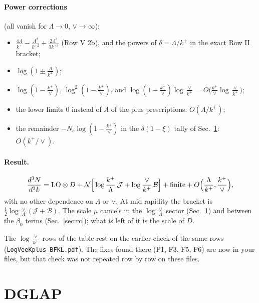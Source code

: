 \documentclass[10pt]{article}
\numberwithin{equation}{section}
\begin{document}
\paragraph{Power corrections} (all vanish for $\Lambda\to0$, $\vee\to\infty$):
\begin{itemize}
\item $\frac{4\Lambda}{k^+}-\frac{\Lambda^2}{k^{+2}}+\frac{2\Lambda^3}{3k^{+3}}$ (Row V 2b), and the powers of $\delta=\Lambda/k^+$ in the exact Row II bracket;
\item $\log(1\pm\frac{\Lambda}{k^+})$;
\item $\log(1-\frac{k^+}{\vee})$, $\log^2(1-\frac{k^+}{\vee})$, and $\log(1-\frac{k^+}{\vee})\log\frac{\vee}{k^+}=O\big(\frac{k^+}{\vee}\log\frac{\vee}{k^+}\big)$;
\item the lower limits $0$ instead of $\Lambda$ of the plus prescriptions: $O(\Lambda/k^+)$;
\item the remainder $-N_c\log(1-\frac{k^+}{\vee})$ in the $\delta(1-\xi)$ tally of Sec.~\ref{sec:dglap}: $O(k^+/\vee)$.
\end{itemize}
\paragraph{Result.}
\begin{equation}
\frac{d^3N}{d^3k}={\rm LO}\otimes D+\mathcal N\Big[\log\frac{k^+}{\Lambda}\,\mathcal J+\log\frac{\vee}{k^+}\,\mathcal B\Big]+\text{finite}+O\Big(\frac{\Lambda}{k^+},\frac{k^+}{\vee}\Big),
\end{equation}
with no other dependence on $\Lambda$ or $\vee$. At mid rapidity the bracket is $\frac12\log\frac{\vee}{\Lambda}(\mathcal J+\mathcal B)$. The scale $\mu$ cancels in the $\log\frac{\vee}{\Lambda}$ sector (Sec.~\ref{sec:dglap}) and between the $\beta_0$ terms (Sec.~\ref{sec:rc}); what is left of it is the scale of $D$.

The $\log\frac{\vee}{k^+}$ rows of the table rest on the earlier check of the same rows (\texttt{LogVeeKplus\_BFKL.pdf}). The fixes found there (P1, F3, F5, F6) are now in your files, but that check was not repeated row by row on these files.

\section{DGLAP}\label{sec:dglap}
\end{document}
